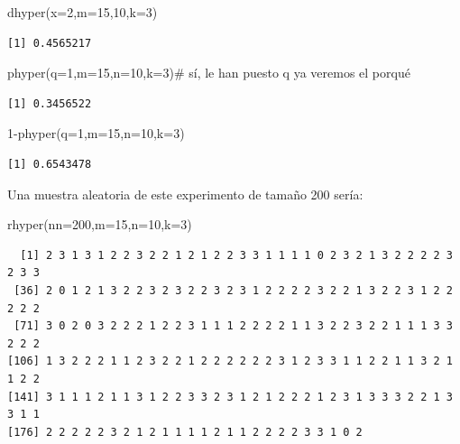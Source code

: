 \documentclass[
  letterpaper,
  DIV=11,
  numbers=noendperiod]{scrreprt}
\newenvironment{Shaded}{\begin{snugshade}}{\end{snugshade}}
\newcommand{\AttributeTok}[1]{\textcolor[rgb]{0.40,0.45,0.13}{#1}}
\newcommand{\CommentTok}[1]{\textcolor[rgb]{0.37,0.37,0.37}{#1}}
\newcommand{\DecValTok}[1]{\textcolor[rgb]{0.68,0.00,0.00}{#1}}
\newcommand{\FunctionTok}[1]{\textcolor[rgb]{0.28,0.35,0.67}{#1}}
\newcommand{\NormalTok}[1]{\textcolor[rgb]{0.00,0.23,0.31}{#1}}
\newcommand{\SpecialCharTok}[1]{\textcolor[rgb]{0.37,0.37,0.37}{#1}}
\begin{document}
\begin{Shaded}
\begin{Highlighting}[]
\FunctionTok{dhyper}\NormalTok{(}\AttributeTok{x=}\DecValTok{2}\NormalTok{,}\AttributeTok{m=}\DecValTok{15}\NormalTok{,}\DecValTok{10}\NormalTok{,}\AttributeTok{k=}\DecValTok{3}\NormalTok{)}
\end{Highlighting}
\end{Shaded}

\begin{verbatim}
[1] 0.4565217
\end{verbatim}

\begin{Shaded}
\begin{Highlighting}[]
\FunctionTok{phyper}\NormalTok{(}\AttributeTok{q=}\DecValTok{1}\NormalTok{,}\AttributeTok{m=}\DecValTok{15}\NormalTok{,}\AttributeTok{n=}\DecValTok{10}\NormalTok{,}\AttributeTok{k=}\DecValTok{3}\NormalTok{)}\CommentTok{\# sí, le han puesto q ya veremos el porqué}
\end{Highlighting}
\end{Shaded}

\begin{verbatim}
[1] 0.3456522
\end{verbatim}

\begin{Shaded}
\begin{Highlighting}[]
\DecValTok{1}\SpecialCharTok{{-}}\FunctionTok{phyper}\NormalTok{(}\AttributeTok{q=}\DecValTok{1}\NormalTok{,}\AttributeTok{m=}\DecValTok{15}\NormalTok{,}\AttributeTok{n=}\DecValTok{10}\NormalTok{,}\AttributeTok{k=}\DecValTok{3}\NormalTok{)}
\end{Highlighting}
\end{Shaded}

\begin{verbatim}
[1] 0.6543478
\end{verbatim}

Una muestra aleatoria de este experimento de tamaño 200 sería:

\begin{Shaded}
\begin{Highlighting}[]
\FunctionTok{rhyper}\NormalTok{(}\AttributeTok{nn=}\DecValTok{200}\NormalTok{,}\AttributeTok{m=}\DecValTok{15}\NormalTok{,}\AttributeTok{n=}\DecValTok{10}\NormalTok{,}\AttributeTok{k=}\DecValTok{3}\NormalTok{)}
\end{Highlighting}
\end{Shaded}

\begin{verbatim}
  [1] 2 3 1 3 1 2 2 3 2 2 1 2 1 2 2 3 3 1 1 1 1 0 2 3 2 1 3 2 2 2 2 3 2 3 3
 [36] 2 0 1 2 1 3 2 2 3 2 3 2 2 3 2 3 1 2 2 2 2 3 2 2 1 3 2 2 3 1 2 2 2 2 2
 [71] 3 0 2 0 3 2 2 2 1 2 2 3 1 1 1 2 2 2 2 1 1 3 2 2 3 2 2 1 1 1 3 3 2 2 2
[106] 1 3 2 2 2 1 1 2 3 2 2 1 2 2 2 2 2 2 3 1 2 3 3 1 1 2 2 1 1 3 2 1 1 2 2
[141] 3 1 1 1 2 1 1 3 1 2 2 3 3 2 3 1 2 1 2 2 2 1 2 3 1 3 3 3 2 2 1 3 3 1 1
[176] 2 2 2 2 2 3 2 1 2 1 1 1 1 2 1 1 2 2 2 2 3 3 1 0 2
\end{verbatim}
\end{document}
